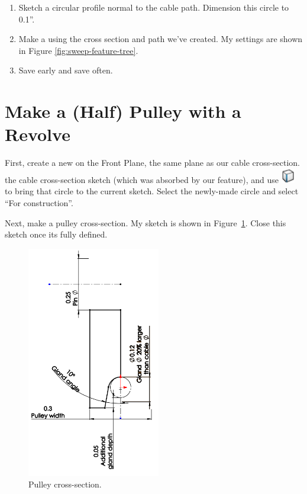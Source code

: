 \begin{enumerate}
\item{} Sketch a circular profile normal to the cable path. Dimension this circle to
0.1''.
\item{} Make a  using the cross section and path we've created. My settings are
shown in Figure \ref{fig:sweep-feature-tree}.
\item{} Save early and save often.
\end{enumerate}

\section{Make a (Half) Pulley with a Revolve}

\label{sec:make_the_pulley}

First, create a new  on the Front Plane, the same plane as our cable
cross-section.  the cable cross-section sketch (which was absorbed by our  feature), and use  \includegraphics{images/symbols/convert-entities.png}
to bring that circle to the current sketch. Select the newly-made circle and
select ``For construction''.

Next, make a pulley cross-section. My sketch is shown in Figure~\ref{fig:pulley-cross-section}. Close this sketch once its fully defined.

\begin{figure}[H]
\begin{center}
  \includegraphics[height=4in]{images/figures/pulley-cross-section.png}
\end{center}
\caption{Pulley cross-section.
\label{fig:pulley-cross-section}}

\end{figure}

